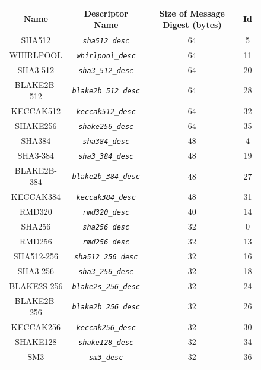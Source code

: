 \documentclass[synpaper]{book}
\newcommand{\code}[1]{\texttt{\textit{#1}}}
\begin{document}
\begin{figure}[H]
\begin{center}
\begin{tabular}{|c|c|c|c|}
\hline \textbf{Name} & \textbf{Descriptor Name} & \textbf{Size of Message Digest (bytes)} & \textbf{Id} \\

\hline SHA512            & \code{sha512\_desc}              & 64 &  5 \\
\hline WHIRLPOOL         & \code{whirlpool\_desc}           & 64 & 11 \\
\hline SHA3-512          & \code{sha3\_512\_desc}           & 64 & 20 \\
\hline BLAKE2B-512       & \code{blake2b\_512\_desc}        & 64 & 28 \\
\hline KECCAK512         & \code{keccak512\_desc}           & 64 & 32 \\
\hline SHAKE256          & \code{shake256\_desc}            & 64 & 35 \\
\hline SHA384            & \code{sha384\_desc}              & 48 &  4 \\
\hline SHA3-384          & \code{sha3\_384\_desc}           & 48 & 19 \\
\hline BLAKE2B-384       & \code{blake2b\_384\_desc}        & 48 & 27 \\
\hline KECCAK384         & \code{keccak384\_desc}           & 48 & 31 \\
\hline RMD320            & \code{rmd320\_desc}              & 40 & 14 \\
\hline SHA256            & \code{sha256\_desc}              & 32 &  0 \\
\hline RMD256            & \code{rmd256\_desc}              & 32 & 13 \\
\hline SHA512-256        & \code{sha512\_256\_desc}         & 32 & 16 \\
\hline SHA3-256          & \code{sha3\_256\_desc}           & 32 & 18 \\
\hline BLAKE2S-256       & \code{blake2s\_256\_desc}        & 32 & 24 \\
\hline BLAKE2B-256       & \code{blake2b\_256\_desc}        & 32 & 26 \\
\hline KECCAK256         & \code{keccak256\_desc}           & 32 & 30 \\
\hline SHAKE128          & \code{shake128\_desc}            & 32 & 34 \\
\hline SM3               & \code{sm3\_desc}                 & 32 & 36 \\

\end{tabular}
\end{center}
\end{figure}
\end{document}
